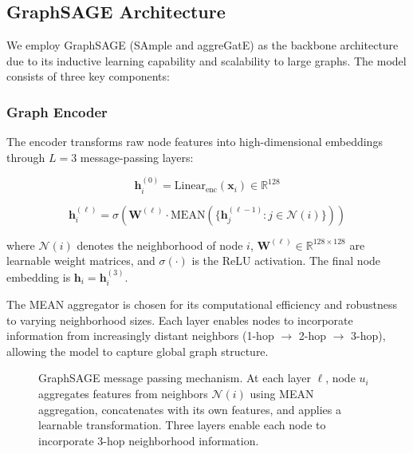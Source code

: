 \documentclass[conference]{IEEEtran}
\begin{document}
\subsection{GraphSAGE Architecture}

We employ GraphSAGE (SAmple and aggreGatE) as the backbone architecture due to its inductive learning capability and scalability to large graphs. The model consists of three key components:

\subsubsection{Graph Encoder}

The encoder transforms raw node features into high-dimensional embeddings through $L=3$ message-passing layers:

\begin{equation}
\mathbf{h}_i^{(0)} = \text{Linear}_{\text{enc}}(\mathbf{x}_i) \in \mathbb{R}^{128}
\end{equation}

\begin{equation}
\mathbf{h}_i^{(\ell)} = \sigma\left( \mathbf{W}^{(\ell)} \cdot \text{MEAN}\left(\{\mathbf{h}_j^{(\ell-1)} : j \in \mathcal{N}(i)\}\right) \right)
\end{equation}

where $\mathcal{N}(i)$ denotes the neighborhood of node $i$, $\mathbf{W}^{(\ell)} \in \mathbb{R}^{128 \times 128}$ are learnable weight matrices, and $\sigma(\cdot)$ is the ReLU activation. The final node embedding is $\mathbf{h}_i = \mathbf{h}_i^{(3)}$.

The MEAN aggregator \cite{hamilton2017inductive} is chosen for its computational efficiency and robustness to varying neighborhood sizes. Each layer enables nodes to incorporate information from increasingly distant neighbors (1-hop $\rightarrow$ 2-hop $\rightarrow$ 3-hop), allowing the model to capture global graph structure.

\begin{figure}[t]
\centering
\resizebox{0.95\textwidth}{!}{}
\caption{GraphSAGE message passing mechanism. At each layer $\ell$, node $u_i$ aggregates features from neighbors $\mathcal{N}(i)$ using MEAN aggregation, concatenates with its own features, and applies a learnable transformation. Three layers enable each node to incorporate 3-hop neighborhood information.}
\label{fig:graphsage_detail}
\end{figure}
\end{document}
